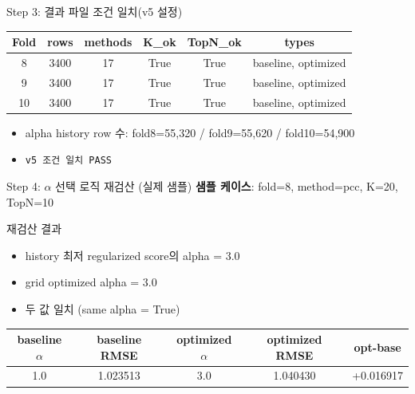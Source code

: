 \documentclass[aspectratio=169,10pt]{beamer}
\begin{document}
\begin{frame}{Step 3: 결과 파일 조건 일치(v5 설정)}
  \begin{center}
  \renewcommand{\arraystretch}{1.2}
  \begin{tabular}{c|c|c|c|c|c}
    \toprule
    Fold & rows & methods & K\_ok & TopN\_ok & types \\
    \midrule
    8  & 3400 & 17 & True & True & baseline, optimized \\
    9  & 3400 & 17 & True & True & baseline, optimized \\
    10 & 3400 & 17 & True & True & baseline, optimized \\
    \bottomrule
  \end{tabular}
  \end{center}

  \vspace{0.3em}
  \begin{itemize}
    \item alpha history row 수: fold8=55,320 / fold9=55,620 / fold10=54,900
    \item \texttt{v5 조건 일치 PASS}
  \end{itemize}
\end{frame}

\begin{frame}{Step 4: \texorpdfstring{$\alpha$}{alpha} 선택 로직 재검산 (실제 샘플)}
  \textbf{샘플 케이스}: fold=8, method=pcc, K=20, TopN=10

  \vspace{0.4em}
  \begin{block}{재검산 결과}
    \begin{itemize}
      \item history 최저 regularized score의 alpha = 3.0
      \item grid optimized alpha = 3.0
      \item 두 값 일치 (same alpha = True)
    \end{itemize}
  \end{block}

  \vspace{0.4em}
  \begin{center}
  \renewcommand{\arraystretch}{1.2}
  \begin{tabular}{c|c|c|c|c}
    \toprule
    baseline \(\alpha\) & baseline RMSE & optimized \(\alpha\) & optimized RMSE & opt-base \\
    \midrule
    1.0 & 1.023513 & 3.0 & 1.040430 & +0.016917 \\
    \bottomrule
  \end{tabular}
  \end{center}
\end{frame}
\end{document}
